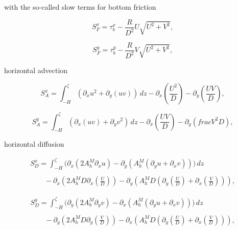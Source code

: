 with the so-called slow terms 
for bottom friction

\begin{equation}\label{Slowfirst}
S^x_{F}=\tau^x_b-\frac{R}{D^2}U\sqrt{U^2+V^2},
\end{equation}

\begin{equation}
S^y_{F}=\tau^y_b-\frac{R}{D^2}V\sqrt{U^2+V^2},
\end{equation}

horizontal advection

\begin{equation}\label{SxA}
S^x_{A}=\int_{-H}^{\zeta}\left(\partial_x u^2+\partial_y(uv)\right)\,dz-
\partial_x\left(\frac{U^2}{D}\right)-\partial_y\left(\frac{UV}{D}\right),
\end{equation}

\begin{equation}\label{SyA} 
S^y_{A}=\int_{-H}^{\zeta}\left(\partial_x (uv)+\partial_yv^2\right)\,dz-
\partial_x\left(\frac{UV}{D}\right)-\partial_y\left(frac{V^2}{D}\right),
\end{equation}

horizontal diffusion

\begin{equation}
\begin{array}{l}
\displaystyle
S^x_D=
\int_{-H}^{\zeta}\big(
\partial_x\left(2A_h^M\partial_xu\right)-\partial_y\left(A_h^M
(\partial_yu+\partial_xv)\right)\big)\,dz
\\ \\
\displaystyle\qquad 
-\partial_x\left(2A_h^MD\partial_x\left(\frac{U}{D}\right)\right)
-\partial_y\left(A_h^MD \left(\partial_y\left(\frac{U}{D}\right)
+\partial_x\left(\frac{V}{D}\right)\right)\right), 
\end{array}
\end{equation} 

\begin{equation}
\begin{array}{l}
\displaystyle
S^y_D=
\int_{-H}^{\zeta}\big(
\partial_y\left(2A_h^M\partial_yv\right)-\partial_x\left(A_h^M
(\partial_yu+\partial_xv)\right)\big)\,dz
\\ \\
\displaystyle\qquad 
-\partial_y\left(2A_h^MD\partial_y\left(\frac{V}{D}\right)\right)
-\partial_x\left(A_h^MD \left(\partial_y\left(\frac{U}{D}\right)
+\partial_x\left(\frac{V}{D}\right)\right)\right), 
\end{array}
\end{equation} 


